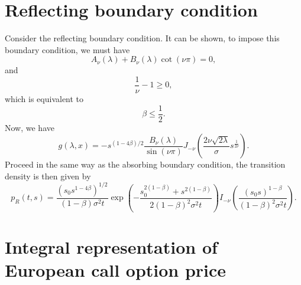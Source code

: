 \documentclass[12pt]{article}
\begin{document}
\section{Reflecting boundary condition}

  Consider the reflecting boundary condition. It can be shown, to impose this boundary condition, we must have
  \begin{equation}
    A_{\nu}(\lambda)+B_{\nu}(\lambda)\cot(\nu\pi)=0,
  \end{equation}
  and
  \begin{equation}
    \frac{1}{\nu}-1\geq 0,
  \end{equation}
  which is equivalent to
  \begin{equation}
    \beta \leq \frac{1}{2}.
  \end{equation}
  Now, we have
  \begin{equation}
    g(\lambda,x)=-s^{(1-4\beta)/2}\frac{B_{\nu}(\lambda)}{\sin(\nu\pi)}J_{-\nu}\left(\frac{2\nu\sqrt{2\lambda}}{\sigma}s^{\frac{1}{2\nu}}\right).
  \end{equation}
  Proceed in the same way as the absorbing boundary condition, the transition density is then given by
  \begin{equation}
    p_R(t,s)=\frac{\left(s_0s^{1-4\beta}\right)^{1/2}}{(1-\beta)\sigma^2t}
    \exp\left(-\frac{s_0^{2(1-\beta)}+s^{2(1-\beta)}}{2(1-\beta)^2\sigma^2t}\right)
    I_{-\nu}\left(\frac{\left(s_0s\right)^{1-\beta}}{(1-\beta)^2\sigma^2t}\right).
  \end{equation}




\section{Integral representation of European call option price}
\end{document}
